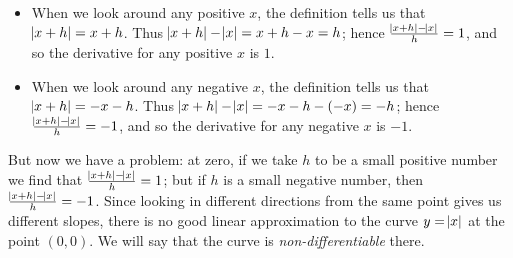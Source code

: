 \begin{itemize}
  \item When we look around any positive $ x $, the definition tells us that $ \abs{x + h} = x + h $.
        Thus $ \abs{x + h} - \abs{x} = x + h - x = h $; hence $ \frac{\abs{x + h} - \abs{x}}{h} = 1 $,
        and so the derivative for any positive $ x $ is $ 1 $.
  \item When we look around any negative $ x $, the definition tells us that $ \abs{x + h} = - x - h $.
        Thus $ \abs{x + h} - \abs{x} = -x - h - (-x) = -h $; hence $ \frac{\abs{x + h} - \abs{x}}{h} = -1 $,
        and so the derivative for any negative $ x $ is $ -1 $.
\end{itemize}

But now we have a problem: at zero, if we take $ h $ to be a small positive number we find that $ \frac{\abs{x + h} - \abs{x}}{h} = 1 $;
but if $ h $ is a small negative number, then $ \frac{\abs{x + h} - \abs{x}}{h} = -1 $. Since looking in different directions from the same point
gives us different slopes, there is no good linear approximation to the curve $ y = \abs{x} $ at the point $ (0,0) $. We will
say that the curve is \emph{non-differentiable} there.

